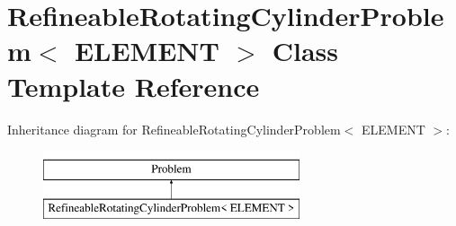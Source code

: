 \hypertarget{classRefineableRotatingCylinderProblem}{}\section{Refineable\+Rotating\+Cylinder\+Problem$<$ E\+L\+E\+M\+E\+NT $>$ Class Template Reference}
\label{classRefineableRotatingCylinderProblem}
Inheritance diagram for Refineable\+Rotating\+Cylinder\+Problem$<$ E\+L\+E\+M\+E\+NT $>$\+:\begin{figure}[H]
\begin{center}
\leavevmode
\includegraphics[height=2.000000cm]{classRefineableRotatingCylinderProblem}
\end{center}
\end{figure}
